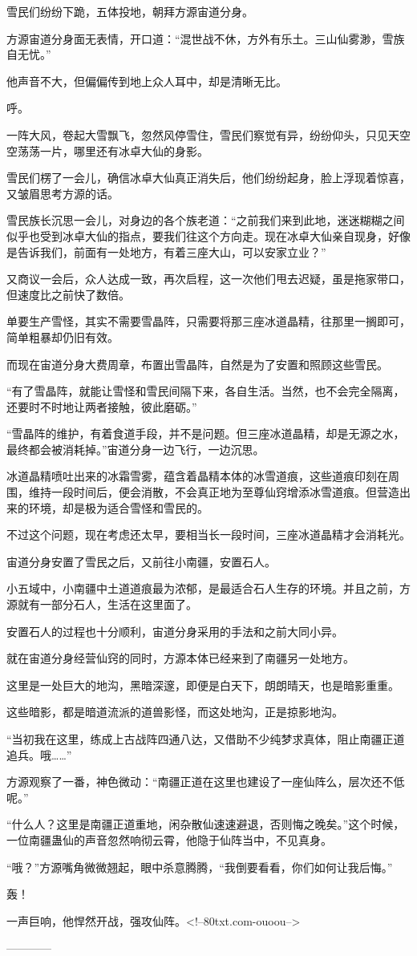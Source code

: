 \begin{this_body}
雪民们纷纷下跪，五体投地，朝拜方源宙道分身。

方源宙道分身面无表情，开口道：“混世战不休，方外有乐土。三山仙雾渺，雪族自无忧。”

他声音不大，但偏偏传到地上众人耳中，却是清晰无比。

呼。

一阵大风，卷起大雪飘飞，忽然风停雪住，雪民们察觉有异，纷纷仰头，只见天空空荡荡一片，哪里还有冰卓大仙的身影。

雪民们楞了一会儿，确信冰卓大仙真正消失后，他们纷纷起身，脸上浮现着惊喜，又皱眉思考方源的话。

雪民族长沉思一会儿，对身边的各个族老道：“之前我们来到此地，迷迷糊糊之间似乎也受到冰卓大仙的指点，要我们往这个方向走。现在冰卓大仙亲自现身，好像是告诉我们，前面有一处地方，有着三座大山，可以安家立业？”

又商议一会后，众人达成一致，再次启程，这一次他们甩去迟疑，虽是拖家带口，但速度比之前快了数倍。

单要生产雪怪，其实不需要雪晶阵，只需要将那三座冰道晶精，往那里一搁即可，简单粗暴却仍旧有效。

而现在宙道分身大费周章，布置出雪晶阵，自然是为了安置和照顾这些雪民。

“有了雪晶阵，就能让雪怪和雪民间隔下来，各自生活。当然，也不会完全隔离，还要时不时地让两者接触，彼此磨砺。”

“雪晶阵的维护，有着食道手段，并不是问题。但三座冰道晶精，却是无源之水，最终都会被消耗掉。”宙道分身一边飞行，一边沉思。

冰道晶精喷吐出来的冰霜雪雾，蕴含着晶精本体的冰雪道痕，这些道痕印刻在周围，维持一段时间后，便会消散，不会真正地为至尊仙窍增添冰雪道痕。但营造出来的环境，却是极为适合雪怪和雪民的。

不过这个问题，现在考虑还太早，要相当长一段时间，三座冰道晶精才会消耗光。

宙道分身安置了雪民之后，又前往小南疆，安置石人。

小五域中，小南疆中土道道痕最为浓郁，是最适合石人生存的环境。并且之前，方源就有一部分石人，生活在这里面了。

安置石人的过程也十分顺利，宙道分身采用的手法和之前大同小异。

就在宙道分身经营仙窍的同时，方源本体已经来到了南疆另一处地方。

这里是一处巨大的地沟，黑暗深邃，即便是白天下，朗朗晴天，也是暗影重重。

这些暗影，都是暗道流派的道兽影怪，而这处地沟，正是掠影地沟。

“当初我在这里，练成上古战阵四通八达，又借助不少纯梦求真体，阻止南疆正道追兵。哦……”

方源观察了一番，神色微动：“南疆正道在这里也建设了一座仙阵么，层次还不低呢。”

“什么人？这里是南疆正道重地，闲杂散仙速速避退，否则悔之晚矣。”这个时候，一位南疆蛊仙的声音忽然响彻云霄，他隐于仙阵当中，不见真身。

“哦？”方源嘴角微微翘起，眼中杀意腾腾，“我倒要看看，你们如何让我后悔。”

轰！

一声巨响，他悍然开战，强攻仙阵。<!--80txt.com-ouoou-->

------------

\end{this_body}

